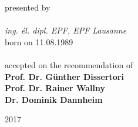 \begin{titlepage}
{\large presented by} \\ \vspace{0.3cm}
{\Large \thesisauthor}\\ \vspace{1cm}
{\Large \textit{ing. \'{e}l. dipl. EPF, EPF Lausanne}}\\ \vspace{1cm}
{\Large born on 11.08.1989} \\
{\Large \thesistown}\\ \vspace{2cm}
{\large accepted on the recommendation of} \\ \vspace{0.5cm}
{\Large \textbf{Prof. Dr. G\"{u}nther Dissertori}} \\ \vspace{0.2cm}
{\Large \textbf{Prof. Dr. Rainer Wallny}} \\ \vspace{0.2cm}
{\Large \textbf{Dr. Dominik Dannheim}} \\ \vspace{1cm}




{\large 2017} %


 

\vfill %

\end{titlepage}
